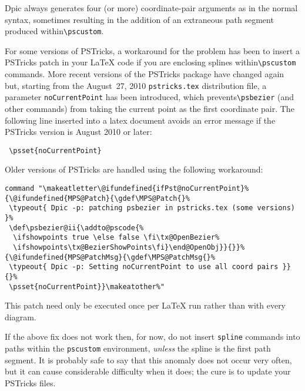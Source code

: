 \documentclass[11pt]{article}
\newcommand{\tBS}{{\tt\char92}}
\begin{document}
  Dpic always generates four (or
  more) coordinate-pair arguments as in the normal syntax, sometimes
  resulting in the addition of an extraneous path segment produced
  within\verb|\pscustom|.

  For some versions of PSTricks,
  a workaround for the problem has been to insert a
  PSTricks patch in your LaTeX code if you are enclosing splines
  within\verb|\pscustom| commands.
  More recent versions of the PSTricks package have changed
  again but, starting from the
  August~27, 2010 {\tt pstricks.tex} distribution file, a parameter
  {\tt noCurrentPoint} has been introduced,
  which prevents\verb|\psbezier| (and other commands)
  from taking the current point as the first coordinate pair.
  The following line inserted into a latex document avoids an
  error message if the PSTricks version is August 2010 or later:
\begin{verbatim}
 \psset{noCurrentPoint}
\end{verbatim}
  Older versions of PSTricks are handled using the following workaround:
\begin{verbatim}
command "\makeatletter\@ifundefined{ifPst@noCurrentPoint}%
{\@ifundefined{MPS@Patch}{\gdef\MPS@Patch{}%
 \typeout{ Dpic -p: patching psbezier in pstricks.tex (some versions) }%
 \def\psbezier@ii{\addto@pscode{%
  \ifshowpoints true \else false \fi\tx@OpenBezier%
  \ifshowpoints\tx@BezierShowPoints\fi}\end@OpenObj}}{}}%
{\@ifundefined{MPS@PatchMsg}{\gdef\MPS@PatchMsg{}%
 \typeout{ Dpic -p: Setting noCurrentPoint to use all coord pairs }}{}%
 \psset{noCurrentPoint}}\makeatother%"
\end{verbatim}

\iffalse
  If you are using a version of PSTricks dated August 2010 or later
  then the above can be simplified to
\begin{verbatim}
 \psset{noCurrentPoint}
\end{verbatim}
\fi

  This patch need only be executed once per LaTeX run rather than with
  every diagram.

  If the above fix does not work then, for now,
  do not insert {\tt spline} commands into paths within the {\tt \tBS pscustom}
  environment, {\em unless} the spline is the first path segment. It is probably
  safe to say that this anomaly does not occur very often, but it
  can cause considerable difficulty when it does; the cure is to update your
  PSTricks files.
\end{document}
